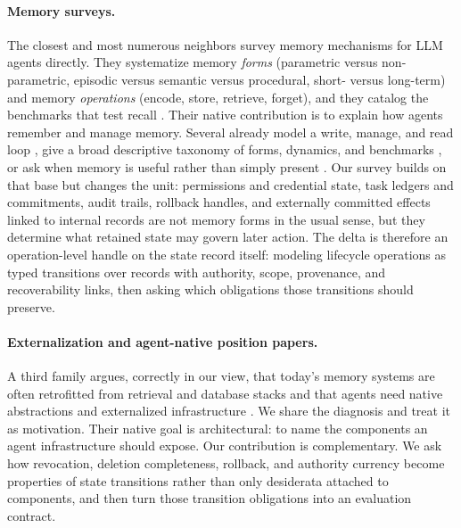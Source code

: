\paragraph{Memory surveys.} The closest and most numerous neighbors survey memory mechanisms for LLM agents directly. They systematize memory \emph{forms} (parametric versus non-parametric, episodic versus semantic versus procedural, short- versus long-term) and memory \emph{operations} (encode, store, retrieve, forget), and they catalog the benchmarks that test recall \citep{zhang2024memorymechanism,du2026memoryautonomous,hu2025memoryageaiagents,huang2026rethinkingmemorymechanisms}. Their native contribution is to explain how agents remember and manage memory. Several already model a write, manage, and read loop \citep{du2026memoryautonomous}, give a broad descriptive taxonomy of forms, dynamics, and benchmarks \citep{hu2025memoryageaiagents}, or ask when memory is useful rather than simply present \citep{huang2026rethinkingmemorymechanisms}. Our survey builds on that base but changes the unit: permissions and credential state, task ledgers and commitments, audit trails, rollback handles, and externally committed effects linked to internal records are not memory forms in the usual sense, but they determine what retained state may govern later action. The delta is therefore an operation-level handle on the state record itself: modeling lifecycle operations as typed transitions over records with authority, scope, provenance, and recoverability links, then asking which obligations those transitions should preserve.

\paragraph{Externalization and agent-native position papers.} A third family argues, correctly in our view, that today's memory systems are often retrofitted from retrieval and database stacks and that agents need native abstractions and externalized infrastructure \citep{zhou2026agentnative,zhou2026externalizationllmagentsunified}. We share the diagnosis and treat it as motivation. Their native goal is architectural: to name the components an agent infrastructure should expose. Our contribution is complementary. We ask how revocation, deletion completeness, rollback, and authority currency become properties of state transitions rather than only desiderata attached to components, and then turn those transition obligations into an evaluation contract.

